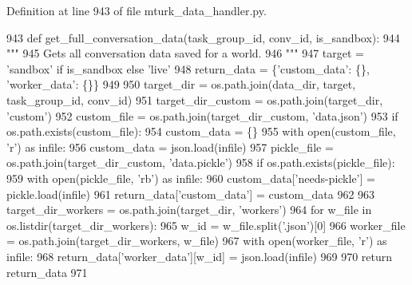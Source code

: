 Definition at line 943 of file mturk\+\_\+data\+\_\+handler.\+py.


\begin{DoxyCode}
943     \textcolor{keyword}{def }get\_full\_conversation\_data(task\_group\_id, conv\_id, is\_sandbox):
944         \textcolor{stringliteral}{"""}
945 \textcolor{stringliteral}{        Gets all conversation data saved for a world.}
946 \textcolor{stringliteral}{        """}
947         target = \textcolor{stringliteral}{'sandbox'} \textcolor{keywordflow}{if} is\_sandbox \textcolor{keywordflow}{else} \textcolor{stringliteral}{'live'}
948         return\_data = \{\textcolor{stringliteral}{'custom\_data'}: \{\}, \textcolor{stringliteral}{'worker\_data'}: \{\}\}
949 
950         target\_dir = os.path.join(data\_dir, target, task\_group\_id, conv\_id)
951         target\_dir\_custom = os.path.join(target\_dir, \textcolor{stringliteral}{'custom'})
952         custom\_file = os.path.join(target\_dir\_custom, \textcolor{stringliteral}{'data.json'})
953         \textcolor{keywordflow}{if} os.path.exists(custom\_file):
954             custom\_data = \{\}
955             with open(custom\_file, \textcolor{stringliteral}{'r') as infile:}
956 \textcolor{stringliteral}{                custom\_data = json.load(infile)}
957 \textcolor{stringliteral}{            pickle\_file = os.path.join(target\_dir\_custom, 'data.pickle'})
958             \textcolor{keywordflow}{if} os.path.exists(pickle\_file):
959                 with open(pickle\_file, \textcolor{stringliteral}{'rb'}) \textcolor{keyword}{as} infile:
960                     custom\_data[\textcolor{stringliteral}{'needs-pickle'}] = pickle.load(infile)
961             return\_data[\textcolor{stringliteral}{'custom\_data'}] = custom\_data
962 
963         target\_dir\_workers = os.path.join(target\_dir, \textcolor{stringliteral}{'workers'})
964         \textcolor{keywordflow}{for} w\_file \textcolor{keywordflow}{in} os.listdir(target\_dir\_workers):
965             w\_id = w\_file.split(\textcolor{stringliteral}{'.json'})[0]
966             worker\_file = os.path.join(target\_dir\_workers, w\_file)
967             with open(worker\_file, \textcolor{stringliteral}{'r') as infile:}
968 \textcolor{stringliteral}{                return\_data['worker\_data'}][w\_id] = json.load(infile)
969 
970         \textcolor{keywordflow}{return} return\_data
971 \end{DoxyCode}
\mbox{\label{classparlai_1_1mturk_1_1core_1_1dev_1_1mturk__data__handler_1_1MTurkDataHandler_aac6a98f191bfacfb9092f2d0138fb429}} 
